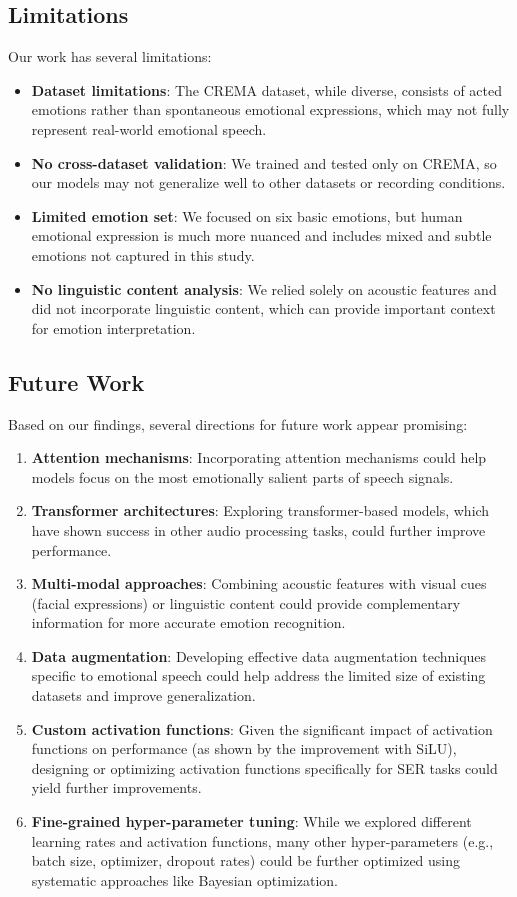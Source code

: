 \subsection{Limitations}
Our work has several limitations:
\begin{itemize}
    \item \textbf{Dataset limitations}: The CREMA dataset, while diverse, consists of acted emotions rather than spontaneous emotional expressions, which may not fully represent real-world emotional speech.
    \item \textbf{No cross-dataset validation}: We trained and tested only on CREMA, so our models may not generalize well to other datasets or recording conditions.
    \item \textbf{Limited emotion set}: We focused on six basic emotions, but human emotional expression is much more nuanced and includes mixed and subtle emotions not captured in this study.
    \item \textbf{No linguistic content analysis}: We relied solely on acoustic features and did not incorporate linguistic content, which can provide important context for emotion interpretation.
\end{itemize}

\subsection{Future Work}
Based on our findings, several directions for future work appear promising:
\begin{enumerate}
    \item \textbf{Attention mechanisms}: Incorporating attention mechanisms could help models focus on the most emotionally salient parts of speech signals.
    \item \textbf{Transformer architectures}: Exploring transformer-based models, which have shown success in other audio processing tasks, could further improve performance.
    \item \textbf{Multi-modal approaches}: Combining acoustic features with visual cues (facial expressions) or linguistic content could provide complementary information for more accurate emotion recognition.
    \item \textbf{Data augmentation}: Developing effective data augmentation techniques specific to emotional speech could help address the limited size of existing datasets and improve generalization.
    \item \textbf{Custom activation functions}: Given the significant impact of activation functions on performance (as shown by the improvement with SiLU), designing or optimizing activation functions specifically for SER tasks could yield further improvements.
    \item \textbf{Fine-grained hyper-parameter tuning}: While we explored different learning rates and activation functions, many other hyper-parameters (e.g., batch size, optimizer, dropout rates) could be further optimized using systematic approaches like Bayesian optimization.
\end{enumerate}

